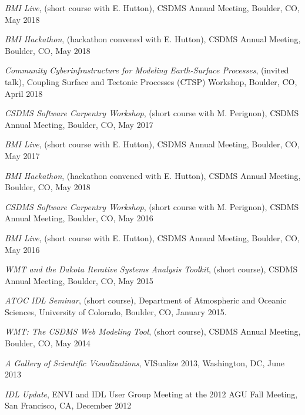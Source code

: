 \begin{enumerate}[{[}1{]}]
  \item \textit{BMI Live}, (short course with E. Hutton),
    CSDMS Annual Meeting, Boulder, CO, May 2018

  \item \textit{BMI Hackathon}, (hackathon convened with E. Hutton),
    CSDMS Annual Meeting, Boulder, CO, May 2018

  \item \textit{Community Cyberinfrastructure for Modeling
    Earth-Surface Processes}, (invited talk), Coupling Surface and
    Tectonic Processes (CTSP) Workshop, Boulder, CO, April 2018

  \item \textit{CSDMS Software Carpentry Workshop}, (short course with
    M. Perignon), CSDMS Annual Meeting, Boulder, CO, May 2017

  \item \textit{BMI Live}, (short course with E. Hutton),
    CSDMS Annual Meeting, Boulder, CO, May 2017

  \item \textit{BMI Hackathon}, (hackathon convened with E. Hutton),
    CSDMS Annual Meeting, Boulder, CO, May 2018

  \item \textit{CSDMS Software Carpentry Workshop}, (short course with
    M. Perignon), CSDMS Annual Meeting, Boulder, CO, May 2016

  \item \textit{BMI Live}, (short course with E. Hutton),
    CSDMS Annual Meeting, Boulder, CO, May 2016

  \item \textit{WMT and the Dakota Iterative Systems Analysis Toolkit},
    (short course), CSDMS Annual Meeting, Boulder, CO, May 2015

  \item \textit{ATOC IDL Seminar}, (short course), Department of
    Atmospheric and Oceanic Sciences, University of Colorado, Boulder,
    CO, January 2015.

  \item \textit{WMT: The CSDMS Web Modeling Tool}, (short course), CSDMS
    Annual Meeting, Boulder, CO, May 2014

  \item \textit{A Gallery of Scientific Visualizations}, {VISualize} 2013,
    Washington, DC, June 2013

  \item \textit{IDL Update}, ENVI and IDL User Group Meeting at the 2012
    AGU Fall Meeting, San Francisco, CA, December 2012


\end{enumerate}

